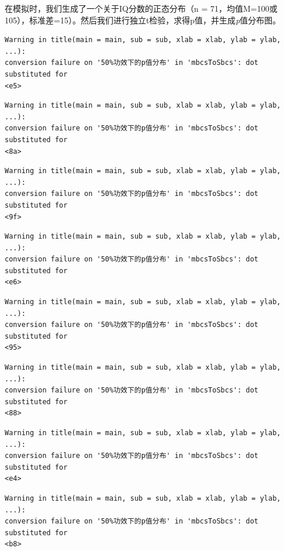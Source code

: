 \documentclass[
  letterpaper,
  DIV=11,
  numbers=noendperiod]{scrreprt}
\begin{document}
在模拟时，我们生成了一个关于IQ分数的正态分布（n =
71，均值M=100或105），标准差=15）。然后我们进行独立t检验，求得p值，并生成\emph{p}值分布图。

\begin{verbatim}
Warning in title(main = main, sub = sub, xlab = xlab, ylab = ylab, ...):
conversion failure on '50%功效下的p值分布' in 'mbcsToSbcs': dot substituted for
<e5>
\end{verbatim}

\begin{verbatim}
Warning in title(main = main, sub = sub, xlab = xlab, ylab = ylab, ...):
conversion failure on '50%功效下的p值分布' in 'mbcsToSbcs': dot substituted for
<8a>
\end{verbatim}

\begin{verbatim}
Warning in title(main = main, sub = sub, xlab = xlab, ylab = ylab, ...):
conversion failure on '50%功效下的p值分布' in 'mbcsToSbcs': dot substituted for
<9f>
\end{verbatim}

\begin{verbatim}
Warning in title(main = main, sub = sub, xlab = xlab, ylab = ylab, ...):
conversion failure on '50%功效下的p值分布' in 'mbcsToSbcs': dot substituted for
<e6>
\end{verbatim}

\begin{verbatim}
Warning in title(main = main, sub = sub, xlab = xlab, ylab = ylab, ...):
conversion failure on '50%功效下的p值分布' in 'mbcsToSbcs': dot substituted for
<95>
\end{verbatim}

\begin{verbatim}
Warning in title(main = main, sub = sub, xlab = xlab, ylab = ylab, ...):
conversion failure on '50%功效下的p值分布' in 'mbcsToSbcs': dot substituted for
<88>
\end{verbatim}

\begin{verbatim}
Warning in title(main = main, sub = sub, xlab = xlab, ylab = ylab, ...):
conversion failure on '50%功效下的p值分布' in 'mbcsToSbcs': dot substituted for
<e4>
\end{verbatim}

\begin{verbatim}
Warning in title(main = main, sub = sub, xlab = xlab, ylab = ylab, ...):
conversion failure on '50%功效下的p值分布' in 'mbcsToSbcs': dot substituted for
<b8>
\end{verbatim}
\end{document}
